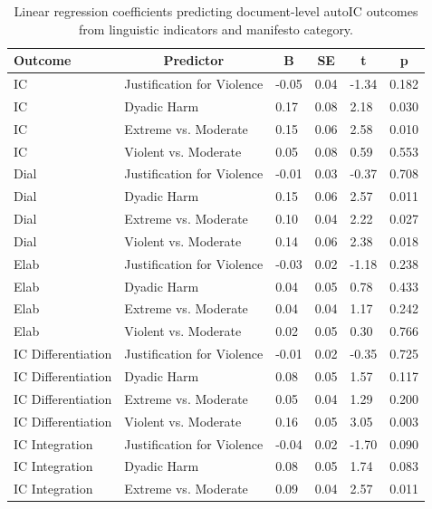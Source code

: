 \documentclass[
  english,
  man,floatsintext]{apa6}
\begin{document}
\begin{table}[tbp]

\begin{center}
\begin{threeparttable}

\caption{\label{tab:manifesto-regressions}Linear regression coefficients predicting document-level autoIC outcomes from linguistic indicators and manifesto category.}

\begin{tabular}{llllll}
\toprule
Outcome & \multicolumn{1}{c}{Predictor} & \multicolumn{1}{c}{B} & \multicolumn{1}{c}{SE} & \multicolumn{1}{c}{t} & \multicolumn{1}{c}{p}\\
\midrule
IC & Justification for Violence & -0.05 & 0.04 & -1.34 & 0.182\\
IC & Dyadic Harm & 0.17 & 0.08 & 2.18 & 0.030\\
IC & Extreme vs. Moderate & 0.15 & 0.06 & 2.58 & 0.010\\
IC & Violent vs. Moderate & 0.05 & 0.08 & 0.59 & 0.553\\
Dial & Justification for Violence & -0.01 & 0.03 & -0.37 & 0.708\\
Dial & Dyadic Harm & 0.15 & 0.06 & 2.57 & 0.011\\
Dial & Extreme vs. Moderate & 0.10 & 0.04 & 2.22 & 0.027\\
Dial & Violent vs. Moderate & 0.14 & 0.06 & 2.38 & 0.018\\
Elab & Justification for Violence & -0.03 & 0.02 & -1.18 & 0.238\\
Elab & Dyadic Harm & 0.04 & 0.05 & 0.78 & 0.433\\
Elab & Extreme vs. Moderate & 0.04 & 0.04 & 1.17 & 0.242\\
Elab & Violent vs. Moderate & 0.02 & 0.05 & 0.30 & 0.766\\
IC Differentiation & Justification for Violence & -0.01 & 0.02 & -0.35 & 0.725\\
IC Differentiation & Dyadic Harm & 0.08 & 0.05 & 1.57 & 0.117\\
IC Differentiation & Extreme vs. Moderate & 0.05 & 0.04 & 1.29 & 0.200\\
IC Differentiation & Violent vs. Moderate & 0.16 & 0.05 & 3.05 & 0.003\\
IC Integration & Justification for Violence & -0.04 & 0.02 & -1.70 & 0.090\\
IC Integration & Dyadic Harm & 0.08 & 0.05 & 1.74 & 0.083\\
IC Integration & Extreme vs. Moderate & 0.09 & 0.04 & 2.57 & 0.011\\

\end{tabular}
\end{threeparttable}
\end{center}
\end{table}
\end{document}
